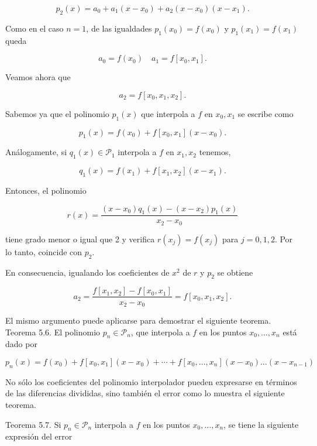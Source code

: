 \documentclass[10pt]{article}
\begin{document}
$$
p_{2}(x)=a_{0}+a_{1}\left(x-x_{0}\right)+a_{2}\left(x-x_{0}\right)\left(x-x_{1}\right) .
$$

Como en el caso $n=1$, de las igualdades $p_{1}\left(x_{0}\right)=f\left(x_{0}\right)$ y $p_{1}\left(x_{1}\right)=f\left(x_{1}\right)$ queda

$$
a_{0}=f\left(x_{0}\right) \quad a_{1}=f\left[x_{0}, x_{1}\right] .
$$

Veamos ahora que

$$
a_{2}=f\left[x_{0}, x_{1}, x_{2}\right] .
$$

Sabemos ya que el polinomio $p_{1}(x)$ que interpola a $f$ en $x_{0}, x_{1}$ se escribe como

$$
p_{1}(x)=f\left(x_{0}\right)+f\left[x_{0}, x_{1}\right]\left(x-x_{0}\right) .
$$

Análogamente, si $q_{1}(x) \in \mathcal{P}_{1}$ interpola a $f$ en $x_{1}, x_{2}$ tenemos,

$$
q_{1}(x)=f\left(x_{1}\right)+f\left[x_{1}, x_{2}\right]\left(x-x_{1}\right) .
$$

Entonces, el polinomio

$$
r(x)=\frac{\left(x-x_{0}\right) q_{1}(x)-\left(x-x_{2}\right) p_{1}(x)}{x_{2}-x_{0}}
$$

tiene grado menor o igual que 2 y verifica $r\left(x_{j}\right)=f\left(x_{j}\right)$ para $j=0,1,2$. Por lo tanto, coincide con $p_{2}$.

En consecuencia, igualando los coeficientes de $x^{2}$ de $r$ y $p_{2}$ se obtiene

$$
a_{2}=\frac{f\left[x_{1}, x_{2}\right]-f\left[x_{0}, x_{1}\right]}{x_{2}-x_{0}}=f\left[x_{0}, x_{1}, x_{2}\right] .
$$

El mismo argumento puede aplicarse para demostrar el siguiente teorema.\\
Teorema 5.6. El polinomio $p_{n} \in \mathcal{P}_{n}$, que interpola a $f$ en los puntos $x_{0}, \ldots, x_{n}$ está dado por


\begin{equation*}
p_{n}(x)=f\left(x_{0}\right)+f\left[x_{0}, x_{1}\right]\left(x-x_{0}\right)+\cdots+f\left[x_{0}, \ldots, x_{n}\right]\left(x-x_{0}\right) \ldots\left(x-x_{n-1}\right) \tag{5.4}
\end{equation*}


No sólo los coeficientes del polinomio interpolador pueden expresarse en términos de las diferencias divididas, sino también el error como lo muestra el siguiente teorema.

Teorema 5.7. Si $p_{n} \in \mathcal{P}_{n}$ interpola a $f$ en los puntos $x_{0}, \ldots, x_{n}$, se tiene la siguiente expresión del error
\end{document}
